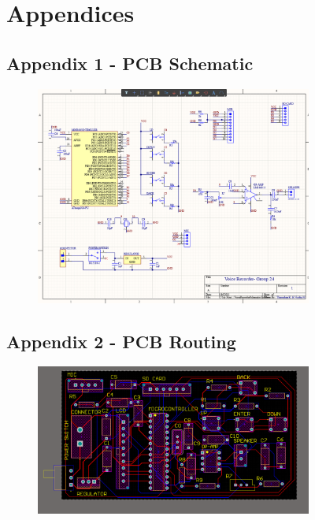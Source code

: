 \documentclass[11pt]{article}
\begin{document}
\onecolumn
\begin{figure}
\section{Appendices}
\subsection{Appendix 1 - PCB Schematic}
    \begin{subfigure}{\textwidth}
    \centering
    \includegraphics[width=1\textwidth]{Images/sch.png}
    \end{subfigure}
\subsection{Appendix 2 - PCB Routing}
    \begin{subfigure}{\textwidth}
    \centering
    \includegraphics[width=1\textwidth]{Images/route.png}
    \end{subfigure}
\end{figure}
\end{document}
